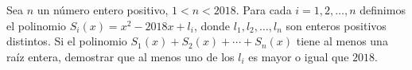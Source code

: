 Sea $n$ un número entero positivo, $1\lt n\lt 2018$. Para cada $i=1, 2, \ldots ,n$ definimos el polinomio $S_i(x)=x^2-2018x+l_i$, donde $l_1, l_2, \ldots, l_n$ son enteros positivos distintos. Si el polinomio $S_1(x)+S_2(x)+\cdots+S_n(x)$ tiene al menos una raíz entera, demostrar que al menos uno de los $l_i$ es mayor o igual que $2018$.

